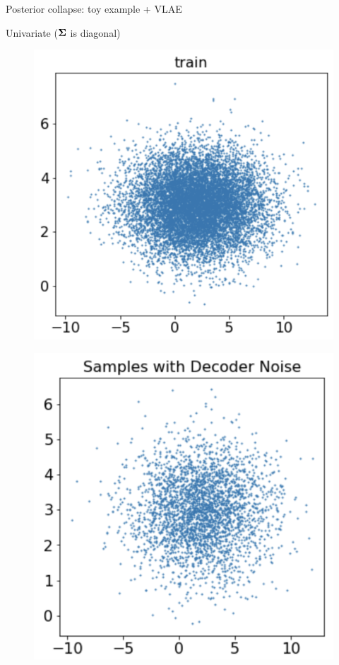 \documentclass{beamer}
\begin{document}
\begin{frame}{Posterior collapse: toy example + VLAE}
	\begin{block}{Univariate ($\boldsymbol{\Sigma}$ is diagonal)}
		\vspace{-0.5cm}
		\begin{minipage}[t]{0.33\columnwidth}
			\begin{figure}[h]
				\centering
				\includegraphics[width=.8\linewidth]{figs/posterior_collapse_toy_2.png}
			\end{figure}
		\end{minipage}%
		\begin{minipage}[t]{0.33\columnwidth}
			\begin{figure}[h]
				\centering
				\includegraphics[width=.75\linewidth]{figs/posterior_collapse_toy_4.png}

\end{figure}
\end{minipage}
\end{block}
\end{frame}
\end{document}
